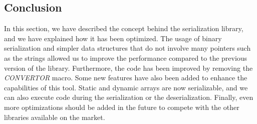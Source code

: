 \subsection{Conclusion}

In this section, we have described the concept behind the serialization library,
and we have explained how it has been optimized. The usage of binary
serialization and simpler data structures that do not involve many pointers such
as the strings allowed us to improve the performance compared to the previous
version of the library. Furthermore, the code has been improved by removing the
\textit{CONVERTOR} macro. Some new features have also been added to enhance the
capabilities of this tool. Static and dynamic arrays are now serializable, and
we can also execute code during the serialization or the deserialization.
Finally, even more optimizations should be added in the future to compete with
the other libraries available on the market.
